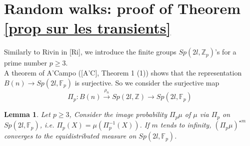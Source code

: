 \documentclass[10pt,a4paper]{amsart}
\newtheorem{lem}{Lemma}
\begin{document}
\section{Random walks: proof of Theorem \ref{prop sur les transients}}
Similarly to Rivin in [Ri], we introduce the finite groups $Sp(2l,\mathbb{Z}_p)$'s for a prime number $p\geq 3$.\\
A theorem of A'Campo  ([A'C], Theorem 1 (1)) shows that the representation $B(n)\longrightarrow Sp(2l,\mathbb{F}_p)$  is surjective. So we consider the surjective map
\begin{equation}\label{representation symplectique}
\Pi_p:B(n)\overset{\rho_n}{\longrightarrow} Sp(2l,\mathbb{Z})
\longrightarrow Sp(2l,\mathbb{F}_p)
\end{equation}   
\begin{lem}\label{uniforme sur Psp} 
	Let $p\geq 3$, Consider the image probability $\Pi_p\mu$ of $\mu$ via $\Pi_p$ on $Sp(2l,\mathbb{F}_p)$, i.e. $\Pi_p(X)=\mu(\Pi_p^{-1}(X))$.  If $m$ tends to infinity, $(\Pi_p\mu)^{\star m}$ converges to the equidistributed measure on $Sp(2l,{\mathbb{F}_p})$. 
\end{lem}
\end{document}
